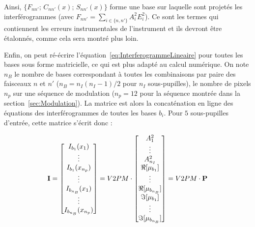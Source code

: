 Ainsi, $\{ F_{nn'} \text{; } C_{nn'}(x) \text{; } S_{nn'}(x)  \}$ forme une base sur laquelle sont projetés les interférogrammes (avec $F_{nn'} = \sum_{i \in \{n,n'\}} A_{i}^{2} E_{i}^{2}$). Ce sont les termes qui contiennent les erreurs instrumentales de l'instrument et ils devront être étalonnés, comme cela sera montré plus loin.

Enfin, on peut ré-écrire l'équation~\ref{eq:InterferogrammeLineaire} pour toutes les bases sous forme matricielle, ce qui est plus adapté au calcul numérique. On note $n_B$ le nombre de bases correspondant à toutes les combinaisons par paire des faisceaux $n$ et $n'$ ($n_B = n_I(n_I-1)/2$ pour $n_I$ sous-pupilles), le nombre de pixels $n_p$ sur une séquence de modulation ($n_p = 12$ pour la séquence montrée dans la section~\ref{sec:Modulation}). La matrice est alors la concaténation en ligne des équations des interférogrammes de toutes les bases $b_i$. Pour $5$ sous-pupilles d'entrée, cette matrice s'écrit donc :

\begin{align}
    \text{\textbf{I}}=
    \begin{bmatrix}
    	I_{b_1}(x_1) \\
    	\vdots \\
    	I_{b_1}(x_{n_p}) \\
    	\vdots \\
    	I_{b_{n_B}}(x_1) \\
    	\vdots \\
    	I_{b_{n_B}}(x_{n_p})
    \end{bmatrix}
    = V2PM \cdot
    \begin{bmatrix}
        A_{1}^2 \\
        \vdots \\
        A_{n_I}^2 \\
        \Re [\mu_{b_1}] \\
        \vdots \\
        \Re [\mu_{b_{n_B}}] \\
        \Im [\mu_{b_1}] \\
        \vdots \\
        \Im [\mu_{b_{n_B}}]
    \end{bmatrix}
    =V2PM\cdot\text{\textbf{P}} \label{eq:IV2PMP}
\end{align}

